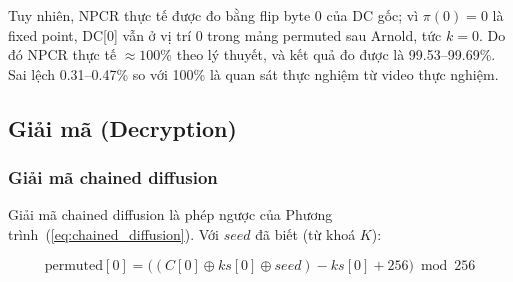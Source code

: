 Tuy nhiên, NPCR thực tế được đo bằng flip byte 0 của DC gốc; vì $\pi(0) = 0$ là fixed point, DC[0] vẫn ở vị trí 0 trong mảng permuted sau Arnold, tức $k = 0$. Do đó NPCR thực tế $\approx 100\%$ theo lý thuyết, và kết quả đo được là 99.53--99.69\%. Sai lệch 0.31--0.47\% so với 100\% là quan sát thực nghiệm từ video thực nghiệm.

\subsection{Giải mã (Decryption)}

\subsubsection{Giải mã chained diffusion}

Giải mã chained diffusion là phép ngược của Phương trình~(\ref{eq:chained_diffusion}). Với $seed$ đã biết (từ khoá $K$):

\begin{equation}
\text{permuted}[0] = \bigl((C[0] \oplus ks[0] \oplus seed) - ks[0] + 256\bigr) \bmod 256
\label{eq:dec0}
\end{equation}

